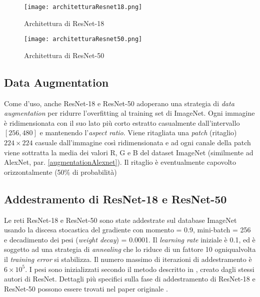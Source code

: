 \begin{figure}[h]
  \begin{minipage}[b]{0.475\textwidth}
  \centering
    \texttt{[image: architetturaResnet18.png]}
    \caption{Architettura di ResNet-18}
    \label{fig:architetturaResnet18}
  \end{minipage}
  \hfill
  \begin{minipage}[b]{0.475\textwidth}
  \centering
    \texttt{[image: architetturaResnet50.png]}
    \caption{Architettura di ResNet-50}
    \label{fig:architetturaResnet50}
  \end{minipage}
\end{figure}

\subsection{Data Augmentation}
\label{augmentationResnet}
Come d'uso, anche ResNet-18 e ResNet-50 adoperano una strategia di \textit{data augmentation} per ridurre l'overfitting al training set di ImageNet.
Ogni immagine è ridimensionata con il suo lato più corto estratto casualmente dall'intervallo $[256,480]$ e mantenendo l'\textit{aspect ratio}. Viene ritagliata una \textit{patch} (ritaglio) $224\times 224$ casuale dall'immagine così ridimensionata e ad ogni canale della patch viene sottratta la media dei valori R, G e B del dataset ImageNet (similmente ad AlexNet, par. \ref{augmentationAlexnet}). Il ritaglio è eventualmente capovolto orizzontalmente (50\% di probabilità)

\subsection{Addestramento di ResNet-18 e ResNet-50}
Le reti ResNet-18 e ResNet-50 sono state addestrate sul database ImageNet usando la discesa stocastica del gradiente con momento = 0.9, mini-batch = 256 e decadimento dei pesi (\textit{weight decay}) = 0.0001. Il \textit{learning rate} iniziale è 0.1, ed è soggetto ad una strategia di \textit{annealing} che lo riduce di un fattore 10 ogniqualvolta il \textit{training error} si stabilizza. Il numero massimo di iterazioni di addestramento è $6\times 10^5$. I pesi sono inizializzati secondo il metodo descritto in \cite{weightsResnet}, creato dagli stessi autori di ResNet. Dettagli più specifici sulla fase di addestramento di ResNet-18 e ResNet-50 possono essere trovati nel paper originale \cite{resnet}.